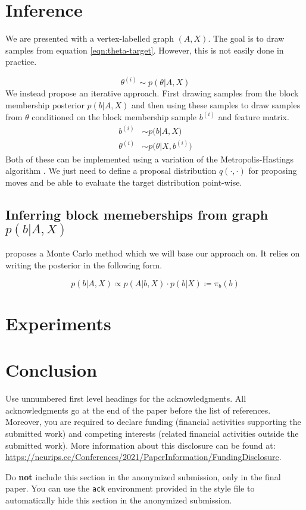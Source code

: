 \documentclass{article}
\begin{document}
\section{Inference}

We are presented with a vertex-labelled graph $(A, X)$. The goal is to draw samples from equation \ref{eqn:theta-target}. However, this is not easily done in practice.

\begin{equation}
	\label{eqn:theta-target}
	\theta^{(i)} \sim p(\theta | A, X)
\end{equation}
%
We instead propose an iterative approach. First drawing samples from the block membership posterior $p(b | A, X)$ and then using these samples to draw samples from $\theta$ conditioned on the block membership sample $b^{(i)}$ and feature matrix. 
%
\begin{align}
	b^{(i)} &\sim p \Big( b | A, X \Big) \\
	\theta^{(i)} &\sim p\Big(\theta | X, b^{(i)} \Big)
\end{align}
%
Both of these can be implemented using a variation of the Metropolis-Hastings algorithm \cite{hastings-alg}. We just need to define a proposal distribution $q(\cdot, \cdot)$ for proposing moves and be able to evaluate the target distribution point-wise.

\subsection{Inferring block memeberships from graph $p (b | A, X)$}

\citet{Peixoto-MCMC} proposes a Monte Carlo method which we will base our approach on. It relies on writing the posterior in the following form.

\begin{equation}
	p(b | A, X) \propto p(A | b, X) \cdot p(b | X) \coloneqq \pi_b(b)
\end{equation}


\section{Experiments}

\section{Conclusion}

\begin{ack}
Use unnumbered first level headings for the acknowledgments. All acknowledgments
go at the end of the paper before the list of references. Moreover, you are required to declare
funding (financial activities supporting the submitted work) and competing interests (related financial activities outside the submitted work).
More information about this disclosure can be found at: \url{https://neurips.cc/Conferences/2021/PaperInformation/FundingDisclosure}.

Do {\bf not} include this section in the anonymized submission, only in the final paper. You can use the \texttt{ack} environment provided in the style file to automatically hide this section in the anonymized submission.
\end{ack}
\end{document}
